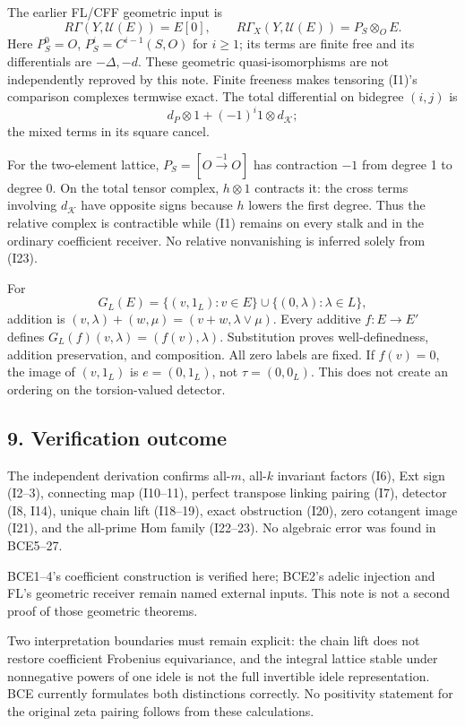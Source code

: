 \documentclass[
  10pt,
]{article}
\begin{document}
The earlier FL/CFF geometric input is \[
R\Gamma(Y,\mathcal U(E))=E[0],\qquad
R\Gamma_X(Y,\mathcal U(E))=P_S\otimes_OE.
\] Here \(P_S^0=O\), \(P_S^i=C^{i-1}(S,O)\) for \(i\ge1\); its terms are
finite free and its differentials are \(-\Delta,-d\). These geometric
quasi-isomorphisms are not independently reproved by this note. Finite
freeness makes tensoring (I1)'s comparison complexes termwise exact. The
total differential on bidegree \((i,j)\) is \[
d_P\otimes1+(-1)^i1\otimes d_{\mathcal K};
\] the mixed terms in its square cancel.

For the two-element lattice, \(P_S=[O\xrightarrow{-1}O]\) has
contraction \(-1\) from degree 1 to degree 0. On the total tensor
complex, \(h\otimes1\) contracts it: the cross terms involving
\(d_{\mathcal K}\) have opposite signs because \(h\) lowers the first
degree. Thus the relative complex is contractible while (I1) remains on
every stalk and in the ordinary coefficient receiver. No relative
nonvanishing is inferred solely from (I23).

For \[
G_L(E)=\{(v,1_L):v\in E\}\cup\{(0,\lambda):\lambda\in L\},
\] addition is \((v,\lambda)+(w,\mu)=(v+w,\lambda\vee\mu)\). Every
additive \(f:E\to E'\) defines \(G_L(f)(v,\lambda)=(f(v),\lambda)\).
Substitution proves well-definedness, addition preservation, and
composition. All zero labels are fixed. If \(f(v)=0\), the image of
\((v,1_L)\) is \(e=(0,1_L)\), not \(\tau=(0,0_L)\). This does not create
an ordering on the torsion-valued detector.

\subsection{9. Verification outcome}\label{verification-outcome}

The independent derivation confirms all-\(m\), all-\(k\) invariant
factors (I6), Ext sign (I2--3), connecting map (I10--11), perfect
transpose linking pairing (I7), detector (I8, I14), unique chain lift
(I18--19), exact obstruction (I20), zero cotangent image (I21), and the
all-prime Hom family (I22--23). No algebraic error was found in
BCE5--27.

BCE1--4's coefficient construction is verified here; BCE2's adelic
injection and FL's geometric receiver remain named external inputs. This
note is not a second proof of those geometric theorems.

Two interpretation boundaries must remain explicit: the chain lift does
not restore coefficient Frobenius equivariance, and the integral lattice
stable under nonnegative powers of one idele is not the full invertible
idele representation. BCE currently formulates both distinctions
correctly. No positivity statement for the original zeta pairing follows
from these calculations.
\end{document}
